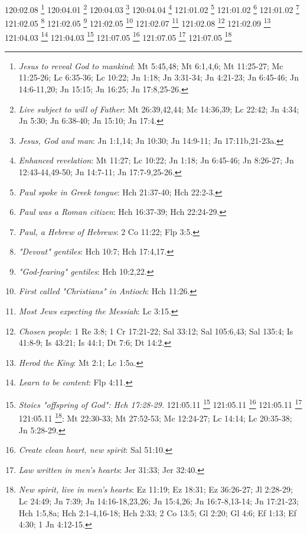 {{{{{{{{{{{{{{120:02.08 \footnote{\textit{Jesus to reveal God to mankind}: Mt 5:45,48; Mt 6:1,4,6; Mt 11:25-27; Mc 11:25-26; Lc 6:35-36; Lc 10:22; Jn 1:18; Jn 3:31-34; Jn 4:21-23; Jn 6:45-46; Jn 14:6-11,20; Jn 15:15; Jn 16:25; Jn 17:8,25-26.}
120:04.01 \footnote{\textit{Live subject to will of Father}: Mt 26:39,42,44; Mc 14:36,39; Lc 22:42; Jn 4:34; Jn 5:30; Jn 6:38-40; Jn 15:10; Jn 17:4.}
120:04.03 \footnote{\textit{Jesus, God and man}: Jn 1:1,14; Jn 10:30; Jn 14:9-11; Jn 17:11b,21-23a.}
120:04.04 \footnote{\textit{Enhanced revelation}: Mt 11:27; Lc 10:22; Jn 1:18; Jn 6:45-46; Jn 8:26-27; Jn 12:43-44,49-50; Jn 14:7-11; Jn 17:7-9,25-26.}
121:01.02 \footnote{\textit{Paul spoke in Greek tongue}: Hch 21:37-40; Hch 22:2-3.}
121:01.02 \footnote{\textit{Paul was a Roman citizen}: Hch 16:37-39; Hch 22:24-29.}
121:01.02 \footnote{\textit{Paul, a Hebrew of Hebrews}: 2 Co 11:22; Flp 3:5.}
121:02.05 \footnote{\textit{"Devout" gentiles}: Hch 10:7; Hch 17:4,17.}
121:02.05 \footnote{\textit{"God-fearing" gentiles}: Hch 10:2,22.}
121:02.05 \footnote{\textit{First called "Christians" in Antioch}: Hch 11:26.}
121:02.07 \footnote{\textit{Most Jews expecting the Messiah}: Lc 3:15.}
121:02.08 \footnote{\textit{Chosen people}: 1 Re 3:8; 1 Cr 17:21-22; Sal 33:12; Sal 105:6,43; Sal 135:4; Is 41:8-9; Is 43:21; Is 44:1; Dt 7:6; Dt 14:2.}
121:02.09 \footnote{\textit{Herod the King}: Mt 2:1; Lc 1:5a.}
121:04.03 \footnote{\textit{Learn to be content}: Flp 4:11.}
121:04.03 \footnote{\textit{Stoics "offspring of God": Hch 17:28-29.}
121:05.11 \footnote{\textit{Blissful realms}: Jn 14:2-3; Ap 3:12; Ap 21:2-4.}
121:05.11 \footnote{\textit{Deliverance from evil}: Job 5:19; Sal 140:1; Pr 2:12; Mt 6:13; Lc 11:4; Gl 1:4; 2 Ti 4:18.}
121:05.11 \footnote{\textit{Life after death}: Dn 12:2; Mt 19:16,29; Mt 25:46; Mc 10:17,30; Lc 10:25; Lc 18:18,30; Jn 3:15-16,36; Jn 4:14, 36; Jn 5:24,39; Jn 6:27,40,47; Jn 6:54,68; Jn 8:51-52; Jn 10:28; Jn 11:25-26; Jn 12:25,50; Jn 17:2-3; Hch 13:46-48; Ro 2:7; Ro 5:21; Ro 6:22-23; Gl 6:8; 1 Ti 1:16; 1 Ti 6:12,19; Tit 1:2; Tit 3:7; 1 Jn 1:2; 1 Jn 2:25; 1 Jn 3:15; 1 Jn 5:11,13,20; Jud 1:21; Ap 22:5.}
121:05.11 \footnote{\textit{Survival of death}: resurrection}: Mt 22:30-33; Mt 27:52-53; Mc 12:24-27; Lc 14:14; Lc 20:35-38; Jn 5:28-29.}
121:07.05 \footnote{\textit{Create clean heart, new spirit}: Sal 51:10.}
121:07.05 \footnote{\textit{Law written in men's hearts}: Jer 31:33; Jer 32:40.}
121:07.05 \footnote{\textit{New spirit, live in men's hearts}: Ez 11:19; Ez 18:31; Ez 36:26-27; Jl 2:28-29; Lc 24:49; Jn 7:39; Jn 14:16-18,23,26; Jn 15:4,26; Jn 16:7-8,13-14; Jn 17:21-23; Hch 1:5,8a; Hch 2:1-4,16-18; Hch 2:33; 2 Co 13:5; Gl 2:20; Gl 4:6; Ef 1:13; Ef 4:30; 1 Jn 4:12-15.}
}}}}}}}}}}}}}}
